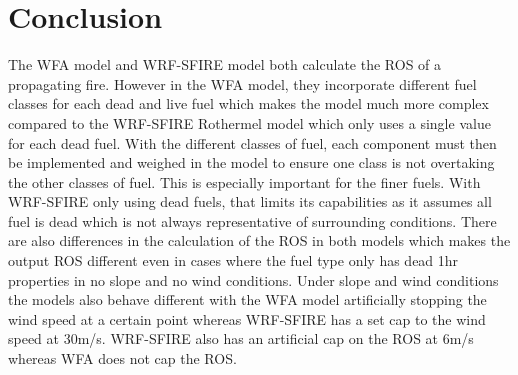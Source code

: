 \documentclass{article}
\begin{document}
\section{Conclusion}
The WFA model and WRF-SFIRE model both calculate the ROS of a propagating fire. However in the WFA model, they incorporate different fuel classes for each dead and live fuel which makes the model much more complex compared to the WRF-SFIRE Rothermel model which only uses a single value for each dead fuel. With the different classes of fuel, each component must then be implemented and weighed in the model to ensure one class is not overtaking the other classes of fuel. This is especially important for the finer fuels. With WRF-SFIRE only using dead fuels, that limits its capabilities as it assumes all fuel is dead which is not always representative of surrounding conditions. There are also differences in the calculation of the ROS in both models which makes the output ROS different even in cases where the fuel type only has dead 1hr properties in no slope and no wind conditions. Under slope and wind conditions the models also behave different with the WFA model artificially stopping the wind speed at a certain point whereas WRF-SFIRE has a set cap to the wind speed at 30m/s. WRF-SFIRE also has an artificial cap on the ROS at 6m/s whereas WFA does not cap the ROS. 


\newpage


\end{document}

